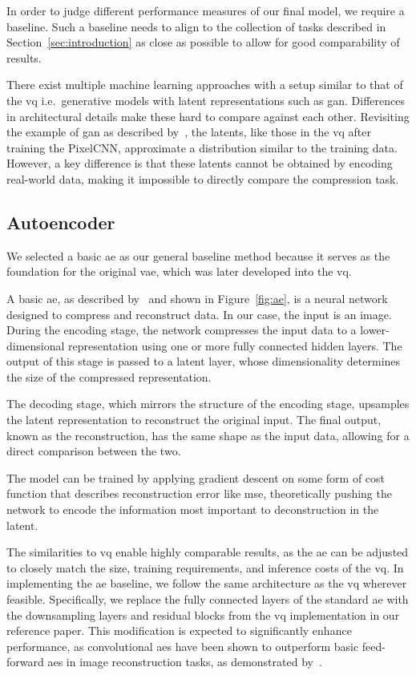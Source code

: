 
In order to judge different performance measures of our final model, we require a baseline.
Such a baseline needs to align to the collection of tasks described in Section~\ref{sec:introduction} as close as
possible to allow for good comparability of results.

There exist multiple machine learning approaches with a setup similar to that of the \ac{vq}
i.e.\ generative models with latent representations such as \ac{gan}.
Differences in architectural details make these hard to compare against each other.
Revisiting the example of \ac{gan} as described by~\cite{gan}, the latents, like those in the \ac{vq} after
training the PixelCNN, approximate a distribution similar to the training data.
However, a key difference is that these latents cannot be obtained by encoding real-world data, making it impossible to
directly compare the compression task.

\subsection{Autoencoder}\label{subsec:autoencoder}
We selected a basic \ac{ae} as our general baseline method because it serves as the foundation for the original
\ac{vae}, which was later developed into the \ac{vq}.

A basic \ac{ae}, as described by~\cite{autoenc} and shown in Figure~\ref{fig:ae}, is a neural network designed to compress and reconstruct data. In our case, the input is an image. During the encoding stage, the network compresses the input data to a lower-dimensional representation using one or more fully connected hidden layers.
The output of this stage is passed to a latent layer, whose dimensionality determines the size of the compressed representation.

The decoding stage, which mirrors the structure of the encoding stage, upsamples the latent representation to reconstruct the original input.
The final output, known as the reconstruction, has the same shape as the input data, allowing for a direct comparison between the two.

The model can be trained by applying gradient descent on some form of cost function that describes reconstruction error
like \ac{mse}, theoretically pushing the network to encode the information most important to deconstruction in the
latent.

The similarities to \ac{vq} enable highly comparable results, as the \ac{ae} can be adjusted to closely match the
size, training requirements, and inference costs of the \ac{vq}.
In implementing the \ac{ae} baseline, we follow the same architecture as the \ac{vq} wherever feasible.
Specifically, we replace the fully connected layers of the standard \ac{ae} with the downsampling layers and
residual blocks from the \ac{vq} implementation in our reference paper.
This modification is expected to significantly enhance performance, as convolutional \ac{ae}s have been shown to
outperform basic feed-forward \ac{ae}s in image reconstruction tasks, as demonstrated by~\cite{convae}.

